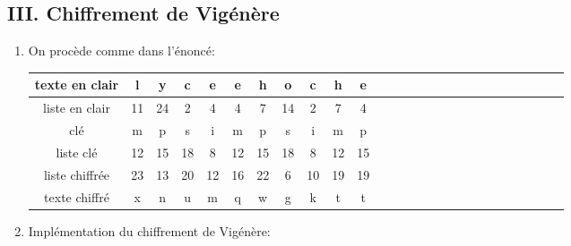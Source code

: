 \subsection*{III. Chiffrement de Vigénère}
\begin{enumerate}
\item On procède comme dans l'énoncé:
\begin{center}
\begin{tabular}{|c|c|c|c|c|c|c|c|c|c|c|c|c|c|c|c|c|c|c|c|c|c|c|c|c|c|} \hline
texte en clair & l  & y  & c  & e  & e  & h  & o  & c  & h  & e\\ \hline
liste en clair & 11 & 24 & 2  & 4  & 4  & 7  & 14 & 2  & 7  & 4\\ \hline 
clé            & m  & p  & s  & i  & m  & p  & s  & i  & m  & p  \\ \hline
liste clé      & 12 & 15 & 18 & 8  & 12 & 15 & 18 & 8  & 12 & 15  \\ \hline
liste chiffrée & 23 & 13 & 20 & 12 & 16 & 22 & 6  & 10 & 19 & 19 \\ \hline
texte chiffré  & x  & n  & u  & m  & q  & w  & g  & k  & t  & t  \\ \hline
\end{tabular}
\end{center}

\item Implémentation du chiffrement de Vigénère:

\end{enumerate}